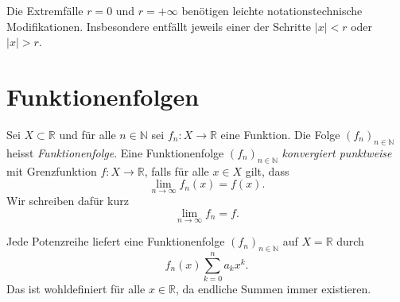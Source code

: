 \documentclass[../main.tex]{subfiles}
\begin{document}
\begin{remark}
  Die Extremfälle $r = 0$ und $r = +\infty$ benötigen leichte notationstechnische
  Modifikationen. Insbesondere entfällt jeweils einer der Schritte
  $|x| < r$ oder $|x| > r$.
\end{remark}

\section{Funktionenfolgen}\label{sec:sequences-of-funs}
\begin{definition}
  Sei $X \subset \mathbb{R}$ und für alle $n \in \mathbb{N}$ sei $f_n \colon X \to \mathbb{R}$ 
  eine Funktion. Die Folge ${(f_{n})}_{n \in \mathbb{N}}$ heisst
  \emph{Funktionenfolge}.
  Eine Funktionenfolge ${(f_{n})}_{n \in \mathbb{N}}$ \emph{konvergiert punktweise}
  mit Grenzfunktion $f \colon X \to \mathbb{R}$, falls für alle $x \in X$ 
  gilt, dass
  \[
    \lim_{n \to \infty} f_n(x) = f(x).
  \]
  Wir schreiben dafür kurz
  \[
    \lim_{n \to \infty} f_n = f.
  \]
\end{definition}

\begin{remark}
  Jede Potenzreihe liefert eine Funktionenfolge ${(f_{n})}_{n \in \mathbb{N}}$ auf $X = \mathbb{R}$ 
  durch
  \[
    f_n(x) \sum_{k=0}^{n} a_k x^k.
  \]
  Das ist wohldefiniert für alle $x \in \mathbb{R}$, da endliche Summen immer existieren.
\end{remark}
\end{document}

